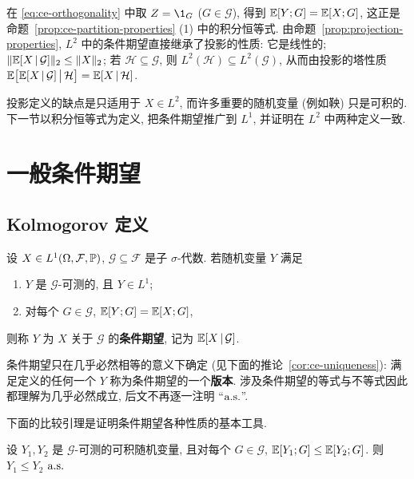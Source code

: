 在 \eqref{eq:ce-orthogonality} 中取 $Z=\1_G$ ($G\in\mathcal{G}$), 得到 $\E[Y;G]=\E[X;G]$, 这正是命题~\ref{prop:ce-partition-properties} (1) 中的积分恒等式. 由命题~\ref{prop:projection-properties}, $L^2$ 中的条件期望直接继承了投影的性质: 它是线性的; $\norm{\E[X\,|\,\mathcal{G}]}_2\le\norm{X}_2$; 若 $\mathcal{H}\subseteq\mathcal{G}$, 则 $L^2(\mathcal{H})\subseteq L^2(\mathcal{G})$, 从而由投影的塔性质 $\E\big[\E[X\,|\,\mathcal{G}]\,\big|\,\mathcal{H}\big]=\E[X\,|\,\mathcal{H}]$.

投影定义的缺点是只适用于 $X\in L^2$, 而许多重要的随机变量 (例如鞅) 只是可积的. 下一节以积分恒等式为定义, 把条件期望推广到 $L^1$, 并证明在 $L^2$ 中两种定义一致.

\section{一般条件期望}
\label{sec:2-2}

\subsection{Kolmogorov 定义}

\begin{definition}\label{def:ce}
设 $X\in L^1(\Omega,\mathcal{F},\P)$, $\mathcal{G}\subseteq\mathcal{F}$ 是子 $\sigma$-代数. 若随机变量 $Y$ 满足
\begin{enumerate}
\item $Y$ 是 $\mathcal{G}$-可测的, 且 $Y\in L^1$;
\item 对每个 $G\in\mathcal{G}$, $\E[Y;G]=\E[X;G]$,
\end{enumerate}
则称 $Y$ 为 $X$ 关于 $\mathcal{G}$ 的\textbf{条件期望}, 记为 $\E[X\,|\,\mathcal{G}]$.
\end{definition}

条件期望只在几乎必然相等的意义下确定 (见下面的推论~\ref{cor:ce-uniqueness}): 满足定义的任何一个 $Y$ 称为条件期望的一个\textbf{版本}. 涉及条件期望的等式与不等式因此都理解为几乎必然成立, 后文不再逐一注明 ``$\as$''.

下面的比较引理是证明条件期望各种性质的基本工具.

\begin{lemma}[比较引理]\label{lem:ce-compare}
设 $Y_1,Y_2$ 是 $\mathcal{G}$-可测的可积随机变量, 且对每个 $G\in\mathcal{G}$, $\E[Y_1;G]\le\E[Y_2;G]$. 则 $Y_1\le Y_2$ $\as$
\end{lemma}

